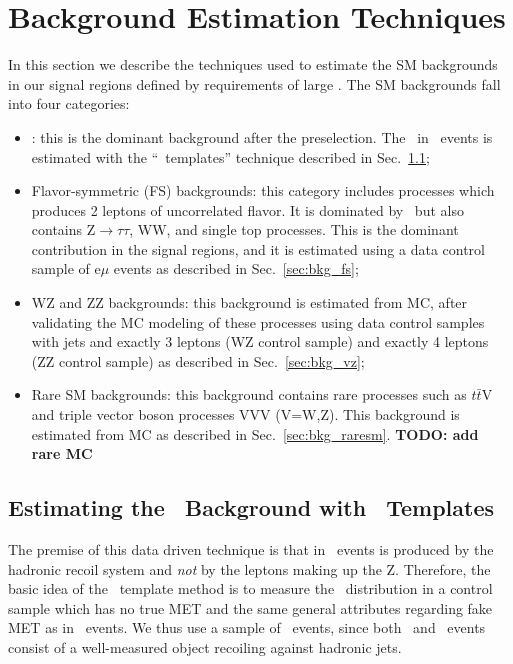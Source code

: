 \clearpage
\section{Background Estimation Techniques}
\label{sec:bkg}

In this section we describe the techniques used to estimate the SM backgrounds in our signal regions defined by requirements of large \MET.
The SM backgrounds fall into four categories:

\begin{itemize}
\item \zjets: this is the dominant background after the preselection. The \MET\ in \zjets\ events is estimated with the 
``\MET\ templates'' technique described in Sec.~\ref{sec:bkg_zjets};
\item Flavor-symmetric (FS) backgrounds: this category includes processes which produces 2 leptons of uncorrelated flavor. It is dominated
by \ttbar\ but also contains Z$\to\tau\tau$, WW, and single top processes. This is the dominant contribution in the signal regions, and it
is estimated using a data control sample of e$\mu$ events as described in Sec.~\ref{sec:bkg_fs};
\item WZ and ZZ backgrounds: this background is estimated from MC, after validating the MC modeling of these processes using data control
samples with jets and exactly 3 leptons (WZ control sample) and exactly 4 leptons (ZZ control sample) as described in Sec.~\ref{sec:bkg_vz};
\item Rare SM backgrounds: this background contains rare processes such as $t\bar{t}$V and triple vector boson processes VVV (V=W,Z).
This background is estimated from MC as described in Sec.~\ref{sec:bkg_raresm}. {\bf TODO: add rare MC}
\end{itemize}

\subsection{Estimating the \zjets\ Background with \MET\ Templates}
\label{sec:bkg_zjets}

The premise of this data driven technique is that \MET in \zjets\ events
is produced by the hadronic recoil system and {\it not} by the leptons making up the Z.
Therefore, the basic idea of the \MET\ template method is to measure the \MET\ distribution in 
a control sample which has no true MET and the same general attributes regarding
fake MET as in \zjets\ events. We thus use a sample of \gjets\ events, since both \zjets\
and \gjets\ events consist of a well-measured object recoiling against hadronic jets.

